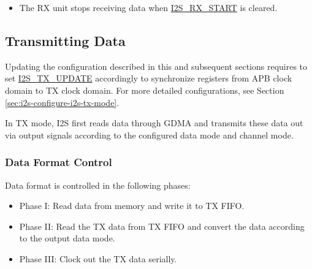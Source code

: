 \documentclass[main\_\_EN.tex]{subfiles}
\begin{document}
\begin{itemize}
\begin{itemize}
\begin{itemize}
            \item 1: The RX unit suspends data reception when \hyperref[fielddesc:I2SRXSTART]{I2S\_RX\_START} is cleared or the number of received bytes reaches the receive length configured in \hyperref[regdesc:I2SRXEOFNUMREG]{I2S\_RXEOF\_NUM\_REG}. If \hyperref[fielddesc:I2SRXSTART]{I2S\_RX\_START} remains set, set \hyperref[fielddesc:I2SRXRESET]{I2S\_RX\_RESET} to restart reception.
            \item 2: The RX unit suspends data reception when \hyperref[fielddesc:I2SRXSTART]{I2S\_RX\_START} is cleared or the trigger condition of \hyperref[int:I2SRXDONEINT]{I2S\_RX\_DONE\_INT} is met. The condition is configured by \hyperref[fielddesc:I2SRXDONEMODE]{I2S\_RX\_DONE\_MODE}; see Section \ref{sec:i2s-interrupts} \textit{}. If \hyperref[fielddesc:I2SRXSTART]{I2S\_RX\_START} remains set, set \hyperref[fielddesc:I2SRXRESET]{I2S\_RX\_RESET} to restart reception.
        \end{itemize}
        \item The RX unit stops receiving data when \hyperref[fielddesc:I2SRXSTART]{I2S\_RX\_START} is cleared.
    \end{itemize}
\end{itemize}

\subsection{Transmitting Data}\label{sec:i2s-tx-data}

\vspace{1em}
\begin{tiplisting}
Updating the configuration described in this and subsequent sections requires to set \hyperref[fielddesc:I2STXUPDATE]{I2S\_TX\_UPDATE} accordingly to synchronize registers from APB clock domain to TX clock domain. For more detailed configurations, see Section \ref{sec:i2s-configure-i2s-tx-mode}.
\end{tiplisting}

\vspace{-1em}
In TX mode, I2S first reads data through GDMA and transmits these data out via output signals according to the configured data mode and channel mode.
\subsubsection{Data Format Control}\label{sec:i2s-data-control}
Data format is controlled in the following phases:
\begin{itemize}
    \item Phase I: Read data from memory and write it to TX FIFO.
    \item Phase II: Read the TX data from TX FIFO and convert the data according to the output data mode.
    \item Phase III: Clock out the TX data serially.
\end{itemize}
\end{document}
